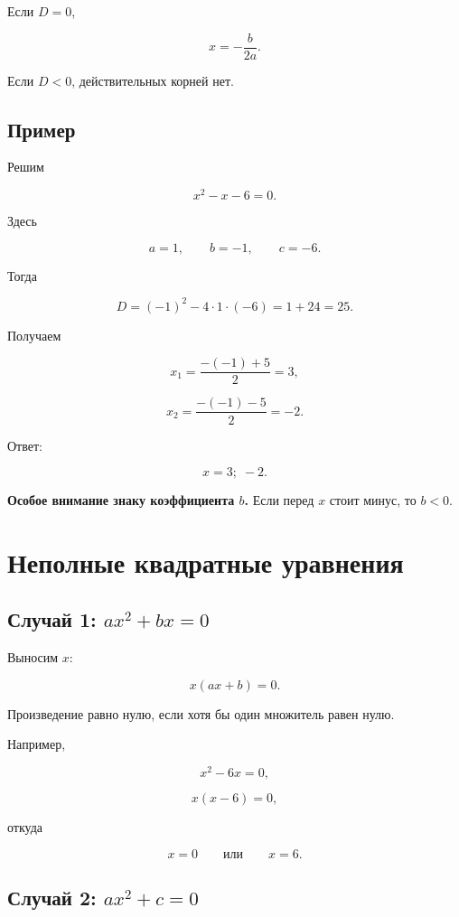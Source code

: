 \documentclass[a4paper,12pt]{article}
\newcommand{\important}[1]{\textbf{\color{darkaccent}#1}}
\begin{document}
Если \(D=0\),

\[
x=-\frac{b}{2a}.
\]

Если \(D<0\), действительных корней нет.

\subsection{Пример}

Решим

\[
x^2-x-6=0.
\]

Здесь

\[
a=1,\qquad b=-1,\qquad c=-6.
\]

Тогда

\[
D=(-1)^2-4\cdot1\cdot(-6)
=1+24
=25.
\]

Получаем

\[
x_1=
\frac{-(-1)+5}{2}
=
3,
\]

\[
x_2=
\frac{-(-1)-5}{2}
=
-2.
\]

Ответ:

\[
\boxed{x=3;\;-2}.
\]

\important{Особое внимание знаку коэффициента \(b\).}
Если перед \(x\) стоит минус, то \(b<0\).



\section{Неполные квадратные уравнения}

\subsection{Случай 1: \(ax^2+bx=0\)}

Выносим \(x\):

\[
x(ax+b)=0.
\]

Произведение равно нулю, если хотя бы один множитель равен нулю.

Например,

\[
x^2-6x=0,
\]

\[
x(x-6)=0,
\]

откуда

\[
x=0
\qquad\text{или}\qquad
x=6.
\]

\subsection{Случай 2: \(ax^2+c=0\)}
\end{document}
